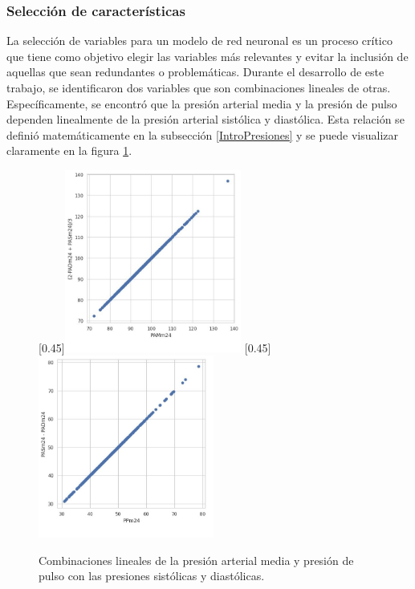 \subsubsection{Selección de características}

La selección de variables para un modelo de red neuronal es un proceso crítico que tiene como objetivo 
elegir las variables más relevantes y evitar la inclusión de aquellas que sean redundantes o 
problemáticas. Durante el desarrollo de este trabajo, se identificaron dos variables que son 
combinaciones lineales de otras. Específicamente, se encontró que la presión arterial media y 
la presión de pulso dependen linealmente de la presión arterial sistólica y diastólica. 
Esta relación se definió matemáticamente en la subsección \ref{IntroPresiones} y 
se puede visualizar claramente en la figura \ref{fig:pamypp}. 

\begin{figure}[h!]
	\centering
	\hspace{1em}
	[0.45\linewidth]{\includegraphics[height=6cm]{./Figures/PAM.jpg}}
	\hspace{1em}
	[0.45\linewidth]{\includegraphics[height=6cm]{./Figures/PP.jpg}}
	\caption{Combinaciones lineales de la presión arterial media y presión de pulso con las presiones sistólicas y diastólicas.}\label{fig:pamypp}
\end{figure}


